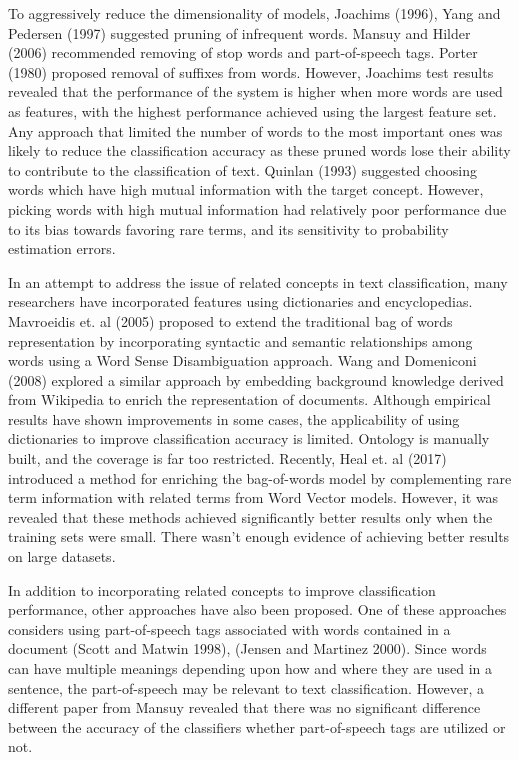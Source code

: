 To aggressively reduce the dimensionality of models, Joachims \cite{joachims1996probabilistic} (1996), Yang and Pedersen\cite{yang1997comparative} (1997) suggested pruning of infrequent words. Mansuy and Hilder \cite{mansuy2006characterization} (2006) recommended removing of stop words and part-of-speech tags. Porter \cite{porter1980algorithm} (1980) proposed removal of suffixes from words. However, Joachims \cite{joachims1996probabilistic} test results revealed that the performance of the system is higher when more words are used as features, with the highest performance achieved using the largest feature set. Any approach that limited the number of words to the most important ones was likely to reduce the classification accuracy as these pruned words lose their ability to contribute to the classification of text. Quinlan \cite{quinlan2014c4} (1993) suggested choosing words which have high mutual information with the target concept. However, picking words with high mutual information had relatively poor performance due to its bias towards favoring rare terms, and its sensitivity to probability estimation errors.

In an attempt to address the issue of related concepts in text classification, many researchers have incorporated features using dictionaries and encyclopedias. Mavroeidis et. al \cite{mavroeidis2005word} (2005) proposed to extend the traditional bag of words representation by incorporating syntactic and semantic relationships among words using a Word Sense Disambiguation approach. Wang and Domeniconi \cite{wang2008building} (2008) explored a similar approach by embedding background knowledge derived from Wikipedia to enrich the representation of documents. Although empirical results have shown improvements in some cases, the applicability of using dictionaries to improve classification accuracy is limited. Ontology is manually built, and the coverage is far too restricted. Recently, Heal et. al \cite{heap2017word} (2017) introduced a method for enriching the bag-of-words model by complementing rare term information with related terms from Word Vector models. However, it was revealed that these methods achieved significantly better results only when the training sets were small. There wasn't enough evidence of achieving better results on large datasets.

In addition to incorporating related concepts to improve classification performance, other approaches have also been proposed. One of these approaches considers using part-of-speech tags associated with words contained in a document (Scott and Matwin \cite{scott1998text} 1998), (Jensen and Martinez \cite{jensen2000improving} 2000). Since words can have multiple meanings depending upon how and where they are used in a sentence, the part-of-speech may be relevant to text classification. However, a different paper from Mansuy \cite{mansuy2006characterization} revealed that there was no significant difference between the accuracy of the classifiers whether part-of-speech tags are utilized or not.

